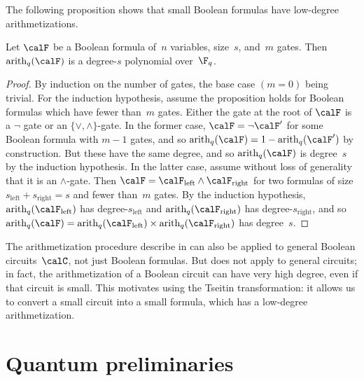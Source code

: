 \documentclass[11pt]{article}
\newcommand{\arith}[2]{\mathrm{arith}_{#1}(#2)}
\begin{document}
The following proposition shows that small Boolean formulas have low-degree arithmetizations.

\begin{proposition}\label{prop:low-degree-arithmetization}
Let $\calF$ be a Boolean formula of~$n$ variables, size~$s$, and~$m$ gates.
Then $\arith{q}{\calF}$ is a degree-$s$ polynomial over~$\F_q$.
\end{proposition}
\begin{proof}
By induction on the number of gates, the base case $(m = 0)$ being trivial.
For the induction hypothesis, assume the proposition holds for Boolean formulas which have fewer than~$m$ gates.
Either the gate at the root of $\calF$ is a $\neg$ gate or an $\{\lor, \land\}$-gate.
In the former case, $\calF = \neg \calF'$ for some Boolean formula with $m-1$ gates,
and so $\arith{q}{\calF} = 1 - \arith{q}{\calF'}$ by construction.
But these have the same degree, and so $\arith{q}{\calF}$ is degree~$s$ by the induction hypothesis.
In the latter case, assume without loss of generality that it is an $\land$-gate. 
Then $\calF= \calF_{\mathrm{left}} \land \calF_{\mathrm{right}}$ for two formulas
of size $s_{\mathrm{left}} + s_{\mathrm{right}} = s$ and fewer than~$m$ gates.
By the induction hypothesis, $\arith{q}{\calF_{\mathrm{left}}}$ has degree-$s_{\mathrm{left}}$ and
$\arith{q}{\calF_{\mathrm{right}}}$ has degree-$s_{\mathrm{right}}$,
and so $\arith{q}{\calF} = \arith{q}{\calF_{\mathrm{left}}} \times \arith{q}{\calF_{\mathrm{right}}}$ has degree~$s$.
\end{proof}

The arithmetization procedure describe in  can also be applied to general Boolean circuits~$\calC$, not just Boolean formulas.
But  does not apply to general circuits;
in fact, the arithmetization of a Boolean circuit can have very high degree, even if that circuit is small.
This motivates using the Tseitin transformation: it allows us to convert a small circuit into a small formula, which has a low-degree arithmetization.




\section{Quantum preliminaries}  \label{sec:prelims}
\end{document}
